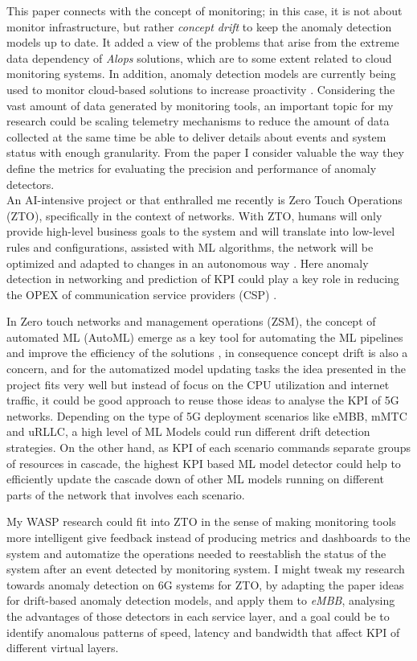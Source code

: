 \documentclass[11pt,a4paper]{article}
\begin{document}
This paper connects with the concept of monitoring; in this case, it is not about monitor infrastructure, but rather \textit{concept drift} to keep the anomaly detection models up to date. It added a view of the problems that arise from the extreme data dependency of \textit{Alops} solutions, which are to some extent related to cloud monitoring systems. In addition, anomaly detection models are currently being used to monitor cloud-based solutions to increase proactivity \cite{huang_acala_2023}. Considering the vast amount of data generated by monitoring tools, an important topic for my research could be scaling telemetry mechanisms to reduce the amount of data collected at the same time be able to deliver details about events and system status with enough granularity. From the paper I consider valuable the way they define the metrics for evaluating the precision and performance of anomaly detectors. 
\\

An AI-intensive project or that enthralled me recently is Zero Touch Operations (ZTO), specifically in the context of networks. With ZTO, humans will only provide high-level business goals to the system and will translate into low-level rules and configurations, assisted with ML algorithms, the network will be optimized and adapted to changes in an autonomous way \cite{crawshaw_lessons_2022}. Here anomaly detection in networking and prediction of KPI could play a key role in reducing the OPEX of communication service providers (CSP) \cite{Alberti2024}. 

In Zero touch networks and management operations (ZSM), the concept of automated ML (AutoML) emerge as a key tool for automating the ML pipelines and improve the efficiency of the solutions \cite{el_rajab_zero-touch_2024}, in consequence concept drift is also a concern, and for the automatized model updating tasks the idea presented in the project fits very well but instead of focus on the CPU utilization and internet traffic, it could be good approach to reuse those ideas to analyse the KPI of 5G networks. Depending on the type of 5G deployment scenarios like eMBB, mMTC and uRLLC, a high level of ML Models could run different drift detection strategies. On the other hand, as KPI of each scenario commands separate groups of resources in cascade, the highest KPI based ML model detector could help to efficiently update the cascade down of other ML models running on different parts of the network that involves each scenario.

My WASP research could fit into ZTO in the sense of making monitoring tools more intelligent give feedback instead of producing metrics and dashboards to the system and automatize the operations needed to reestablish the status of the system after an event detected by monitoring system. I might tweak my research towards anomaly detection on 6G systems for ZTO, by adapting the paper ideas for drift-based anomaly detection models, and apply them to \textit{eMBB}, analysing the advantages of those detectors in each service layer, and a goal could be to identify anomalous patterns of speed, latency and bandwidth that affect KPI of different virtual layers.   
\end{document}
